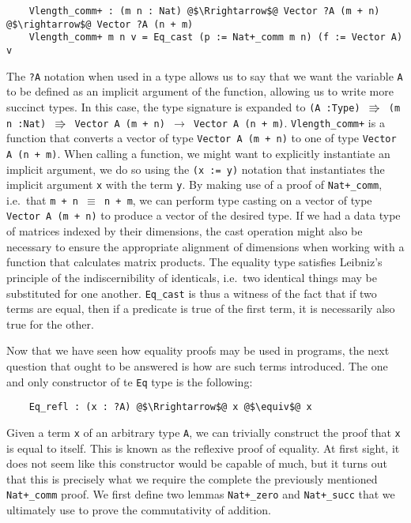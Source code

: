 \documentclass[12pt,twoside,maitrise]{dms}
\theoremstyle{definition}
\numberwithin{equation}{section}
\numberwithin{table}{chapter}
\numberwithin{figure}{chapter}
\newcommand\id[1] {\texttt{#1}}
\newcommand\fn[1] {\texttt{#1}}
\begin{document}
\begin{verbatim}
    Vlength_comm+ : (m n : Nat) @$\Rrightarrow$@ Vector ?A (m + n) @$\rightarrow$@ Vector ?A (n + m)
    Vlength_comm+ m n v = Eq_cast (p := Nat+_comm m n) (f := Vector A) v
\end{verbatim}

The \id{?A} notation when used in a type allows us to say that we want the
variable \id{A} to be defined as an implicit argument of the function, allowing
us to write more succinct types. In this case, the type signature is expanded to
\fn{(A :\@ Type) $\Rrightarrow$ (m n :\@ Nat) $\Rrightarrow$ Vector A
  (m + n) $\rightarrow$ Vector A (n + m)}. \fn{Vlength\_comm+} is a function
that converts a vector of type \fn{Vector A (m + n)} to one of type \fn{Vector A
  (n + m)}. When calling a function, we might want to explicitly instantiate an
implicit argument, we do so using the \fn{(x := y)} notation that instantiates
the implicit argument \id{x} with the term \id{y}. By making use of a proof of
\id{Nat+\_comm}, i.e.\ that \fn{m + n $\equiv$ n + m}, we can perform type
casting on a vector of type \fn{Vector A (m + n)} to produce a vector of the
desired type. If we had a data type of matrices indexed by their dimensions, the
cast operation might also be necessary to ensure the appropriate alignment of
dimensions when working with a function that calculates matrix products. The
equality type satisfies Leibniz's principle of the indiscernibility of
identicals, i.e.\ two identical things may be substituted for one another.
\fn{Eq\_cast} is thus a witness of the fact that if two terms are equal, then if
a predicate is true of the first term, it is necessarily also true for the
other.

Now that we have seen how equality proofs may be used in programs, the next
question that ought to be answered is how are such terms introduced. The one and
only constructor of te \id{Eq} type is the following:

\begin{verbatim}
    Eq_refl : (x : ?A) @$\Rrightarrow$@ x @$\equiv$@ x
\end{verbatim}

Given a term \id{x} of an arbitrary type \id{A}, we can trivially construct the
proof that \id{x} is equal to itself. This is known as the reflexive proof of
equality. At first sight, it does not seem like this constructor would be
capable of much, but it turns out that this is precisely what we require the
complete the previously mentioned \id{Nat+\_comm} proof. We first define two
lemmas \id{Nat+\_zero} and \id{Nat+\_succ} that we ultimately use to prove the
commutativity of addition.
\end{document}

